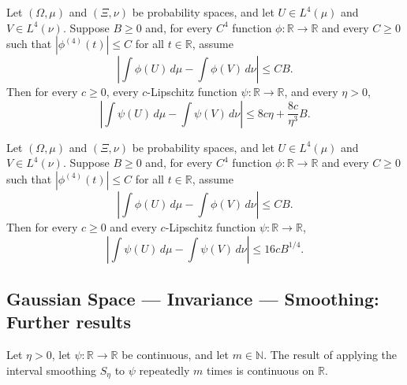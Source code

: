 \begin{theorem}
\leanok
{}
Let $(\Omega,\mu)$ and $(\Xi,\nu)$ be probability spaces, and let $U\in L^4(\mu)$ and
$V\in L^4(\nu)$. Suppose $B\ge0$ and, for every $C^4$ function $\phi:\mathbb R\to\mathbb
R$ and every $C\ge0$ such that $|\phi^{(4)}(t)|\le C$ for all $t\in\mathbb R$, assume
\[
\left|\int \phi(U)\,d\mu-\int \phi(V)\,d\nu\right|\le CB.
\]
Then for every $c\ge0$, every $c$-Lipschitz function $\psi:\mathbb R\to\mathbb R$, and
every $\eta>0$,
\[
\left|\int \psi(U)\,d\mu-\int \psi(V)\,d\nu\right|\le 8c\eta+\frac{8c}{\eta^3}B.
\]
\end{theorem}

\begin{theorem}
\leanok
{}
Let $(\Omega,\mu)$ and $(\Xi,\nu)$ be probability spaces, and let $U\in L^4(\mu)$ and
$V\in L^4(\nu)$. Suppose $B\ge0$ and, for every $C^4$ function $\phi:\mathbb R\to\mathbb
R$ and every $C\ge0$ such that $|\phi^{(4)}(t)|\le C$ for all $t\in\mathbb R$, assume
\[
\left|\int \phi(U)\,d\mu-\int \phi(V)\,d\nu\right|\le CB.
\]
Then for every $c\ge0$ and every $c$-Lipschitz function $\psi:\mathbb R\to\mathbb R$,
\[
\left|\int \psi(U)\,d\mu-\int \psi(V)\,d\nu\right|\le16cB^{1/4}.
\]
\end{theorem}

\subsection*{Gaussian Space --- Invariance --- Smoothing: Further results}

\begin{theorem}
\label{BooleanAnalysis.GaussianSpace.Invariance.continuous_intervalSmooth_iterate}
\leanok
{}
Let $\eta>0$, let $\psi\colon\mathbb R\to\mathbb R$ be continuous, and let $m\in\mathbb
N$. The result of applying the interval smoothing $S_\eta$ to $\psi$ repeatedly $m$
times is continuous on $\mathbb R$.
\end{theorem}

